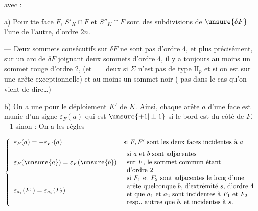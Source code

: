 avec :

a) Pour tte  face \(F\), \(S'_K\cap F\) et \(S''_K\cap F\) sont des subdivisions de \(\unsure{\delta F}\)  l'une de l'autre, d'ordre \(2n\).

 --- Deux sommets consécutifs sur \(\delta F\) ne sont pas d'ordre 4, et plus précisément,  sur un arc de \(\delta F\) joignant deux sommets d'ordre 4, il y a toujours au moins un sommet rouge d'ordre 2, (et $=$ deux si \(\Sigma\) n'est pas  de type \(\mathrm{II}_p\) et si on est sur une arête exceptionnelle) et au moins un sommet noir ( pas dans le cas qu'on vient de dire\dots)

b)  On a une  pour le déploiement \(K'\) de \(K\). Ainsi, chaque arête \(a\) d'une face  est munie d'un signe \(\varepsilon_F(a)\) qui est \(\unsure{+1|\pm1}\) si le bord est du côté de \(F\), \(-1\) sinon : On a les règles

\[
\left\{\begin{array}{ll}
\varepsilon_F(a)=-\varepsilon_{F'}(a)&\text{si \(F,F'\) sont les deux faces incidentes à \(a\)}\\[6pt]
\varepsilon_F(\unsure{a})=\varepsilon_F(\unsure{b})&\begin{array}{l}\text{si \(a\) et \(b\) sont adjacentes}\\\text{sur \(F\), le sommet commun étant}\\\text{d'ordre 2}\end{array}\\[6pt]
\varepsilon_{a_1}(F_1)=\varepsilon_{a_2}(F_2)&\begin{array}{l}\text{si \(F_1\) et \(F_2\) sont adjacentes le long d'une}\\\text{arête quelconque \(b\), d'extrémité \(s\), d'ordre 4}\\\text{et que \(a_1\) et \(a_2\) sont incidentes à \(F_1\) et \(F_2\)}\\\text{resp., autres que \(b\), et incidentes à \(s\).}\end{array}
\end{array}\right.
\]

